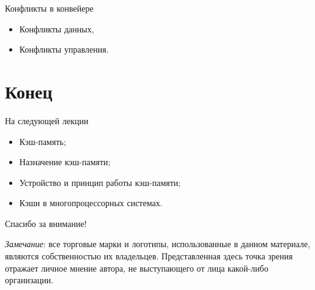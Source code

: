\begin{frame}{Конфликты в конвейере}
\begin{itemize}
    \item Конфликты данных,
    \item Конфликты управления.
\end{itemize}
\end{frame}

\section*{Конец}

\begin{frame}{На следующей лекции}
\begin{itemize}
    \item Кэш-память;
    \item Назначение кэш-памяти;
    \item Устройство и принцип работы кэш-памяти;
    \item Кэши в многопроцессорных системах.
\end{itemize}
\end{frame}

\begin{frame}

{\huge{Спасибо за внимание!}\par}

\vfill

\tiny{\textit{Замечание}: все торговые марки и логотипы, использованные в данном материале, являются собственностью их владельцев. Представленная здесь точка зрения отражает личное мнение автора, не выступающего от лица какой-либо организации.}

\end{frame}


